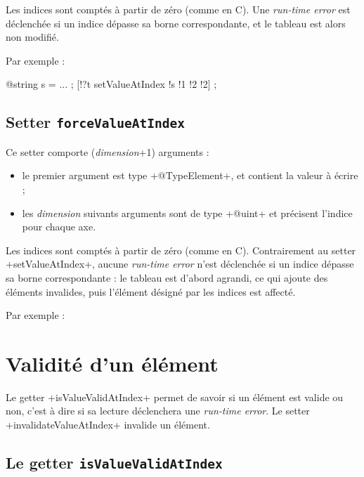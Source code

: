 Les indices sont comptés à partir de zéro (comme en C). Une \emph{run-time error} est déclenchée si un indice dépasse sa borne correspondante, et le tableau est alors non modifié.

Par exemple :
\begin{galgas}
  @string s = ... ;
  [!?t setValueAtIndex !s !1 !2 !2] ;
\end{galgas}





\subsection{Setter \texttt{forceValueAtIndex}}

Ce setter comporte (\emph{dimension}+1) arguments :
\begin{itemize}
  \item le premier argument est type \ggs+@TypeElement+, et contient la valeur à écrire ;
  \item les \emph{dimension} suivants arguments sont de type \ggs+@uint+ et précisent l'indice pour chaque axe.
\end{itemize} 
  
Les indices sont comptés à partir de zéro (comme en C). Contrairement au setter \ggs+setValueAtIndex+, aucune \emph{run-time error} n'est déclenchée si un indice dépasse sa borne correspondante : le tableau est d'abord agrandi, ce qui ajoute des éléments invalides, puis l'élément désigné par les indices est affecté.

Par exemple :
\begin{galgas}
  @string s = ... ;
  [}?t forceValueAtIndex !s !5 !4 !4] ;
\end{galgas}





\section{Validité d'un élément}

Le getter \ggs+isValueValidAtIndex+ permet de savoir si un élément est valide ou non, c'est à dire si sa lecture déclenchera une \emph{run-time error}. Le setter \ggs+invalidateValueAtIndex+ invalide un élément.

\subsection{Le getter \texttt{isValueValidAtIndex}}

